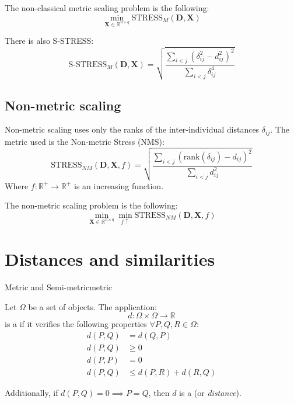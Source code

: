 The non-classical metric scaling problem is the following:
\begin{equation*}
    \min_{\boldsymbol{X} \in \mathds{R}^{n\times q}} \text{STRESS}_M(\boldsymbol{D}, \boldsymbol{X})
\end{equation*}

There is also S-STRESS:
\begin{equation*}
    \text{S-STRESS}_M(\boldsymbol{D}, \boldsymbol{X}) = \sqrt{\frac
        {\sum_{i<j}(\delta_{ij}^2 - d_{ij}^2)^2}
        {\sum_{i<j}\delta_{ij}^4}
    }
\end{equation*}

\subsection{Non-metric scaling}
Non-metric scaling uses only the ranks of the inter-individual distances $\delta_{ij}$.
The metric used is the Non-metric Stress (NMS):
\begin{equation*}
    \text{STRESS}_{NM}(\boldsymbol{D}, \boldsymbol{X}, f) = \sqrt{\frac
        {\sum_{i<j}(\text{rank}(\delta_{ij}) - d_{ij})^2}
        {\sum_{i<j}d_{ij}^2}
    }
\end{equation*}
Where $f: \mathds{R}^+ \to \mathds{R}^+$ is an increasing function.

The non-metric scaling problem is the following:
\begin{equation*}
    \min_{\boldsymbol{X} \in \mathds{R}^{n\times q}} \min_{f\uparrow} \text{STRESS}_{NM}(\boldsymbol{D}, \boldsymbol{X}, f)
\end{equation*}

\section{Distances and similarities}

\begin{definition}{Metric and Semi-metric}{metric}

    Let $\Omega$ be a set of objects. The application:
    \begin{equation*}
        d: \Omega \times \Omega \to \mathds{R}
    \end{equation*}
    is a  if it verifies the following properties $\forall P, Q, R \in \Omega$:
    \begin{align*}
        d(P, Q) &= d(Q, P) \tag{symmetry} \\
        d(P, Q) &\geq 0 \tag{non-negativity} \\
        d(P, P) &= 0 \tag{identity} \\
        d(P, Q) &\leq d(P, R) + d(R, Q) \tag{triangle inequality}
    \end{align*}

    \begin{marker}
        Additionally, if $d(P, Q) = 0 \implies P = Q$, then $d$ is a  (or \emph{distance}).
    \end{marker}
\end{definition}

